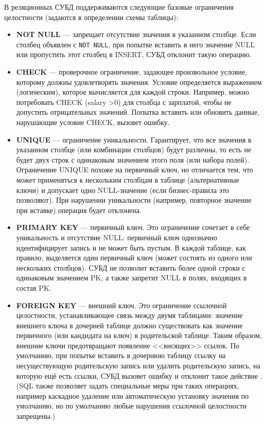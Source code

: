  В реляционных СУБД поддерживаются следующие базовые ограничения целостности (задаются в определении схемы таблицы): 
 \begin{itemize}
    \item \textbf{NOT NULL} — запрещает отсутствие значения в указанном столбце. Если столбец объявлен с \texttt{NOT NULL}, при попытке вставить в него значение NULL или пропустить этот столбец в INSERT, СУБД отклонит такую операцию.
    \item \textbf{CHECK} — проверочное ограничение, задающее произвольное условие, которому должны удовлетворять значения. Условие определяется выражением (логическим), которое вычисляется для каждой строки. Например, можно потребовать CHECK (salary \textgreater 0) для столбца с зарплатой, чтобы не допустить отрицательных значений. Попытка вставить или обновить данные, нарушающие условие CHECK, вызовет ошибку.
    \item \textbf{UNIQUE} — ограничение уникальности. Гарантирует, что все значения в указанном столбце (или комбинации столбцов) будут различны, то есть не будет двух строк с одинаковым значением этого поля (или набора полей). Ограничение UNIQUE похоже на первичный ключ, но отличается тем, что может применяться к нескольким столбцам в таблице (альтернативные ключи) и допускает одно NULL-значение (если бизнес-правила это позволяют). При нарушении уникальности (например, повторное значение при вставке) операция будет отклонена.
    \item \textbf{PRIMARY KEY} — первичный ключ. Это ограничение сочетает в себе уникальность и отсутствие NULL: первичный ключ однозначно идентифицирует запись и не может быть пустым. В каждой таблице, как правило, выделяется один первичный ключ (может состоять из одного или нескольких столбцов). СУБД не позволит вставить более одной строки с одинаковым значением PK, а также запретит NULL в полях, входящих в состав PK.
    \item \textbf{FOREIGN KEY} — внешний ключ. Это ограничение ссылочной целостности, устанавливающее связь между двумя таблицами: значение внешнего ключа в дочерней таблице должно существовать как значение первичного (или кандидата на ключ) в родительской таблице. Таким образом, внешние ключи предотвращают появление <<висящих>> ссылок. По умолчанию, при попытке вставить в дочернюю таблицу ссылку на несуществующую родительскую запись или удалить родительскую запись, на которую ещё есть ссылки, СУБД вызовет ошибку и отклонит такое действие \autocite{Silberschatz}. (SQL также позволяет задать специальные меры при таких операциях, например каскадное удаление или автоматическую установку значения по умолчанию, но по умолчанию любые нарушения ссылочной целостности запрещены.)
 \end{itemize} 

